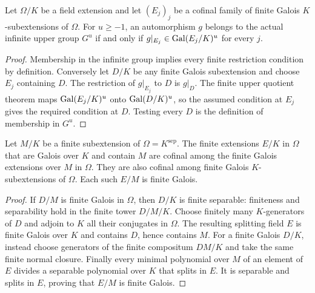 \begin{lemma}
\label{fw:cofinal-upper-conditions}
\leanok
Let $\Omega/K$ be a field extension and let $(E_j)_j$ be a cofinal
family of finite Galois $K$-subextensions of $\Omega$. For $u\geq-1$,
an automorphism $g$ belongs to the actual infinite upper group $G^u$
if and only if $g|_{E_j}\in\operatorname{Gal}(E_j/K)^u$ for every $j$.
\end{lemma}
\begin{proof}
Membership in the infinite group implies every finite restriction
condition by definition. Conversely let $D/K$ be any finite Galois
subextension and choose $E_j$ containing $D$. The restriction of
$g|_{E_j}$ to $D$ is $g|_D$. The finite upper quotient theorem maps
$\operatorname{Gal}(E_j/K)^u$ onto $\operatorname{Gal}(D/K)^u$, so the assumed condition at
$E_j$ gives the required condition at $D$. Testing every $D$ is the
definition of membership in $G^u$.
\end{proof}

\begin{lemma}
\label{fw:cofinal-base-galois-layers}
\leanok
Let $M/K$ be a finite subextension of $\Omega=K^{\mathrm{sep}}$.
The finite extensions $E/K$ in $\Omega$ that are Galois over $K$ and
contain $M$ are cofinal among the finite Galois extensions over $M$
in $\Omega$. They are also cofinal among finite Galois $K$-subextensions
of $\Omega$. Each such $E/M$ is finite Galois.
\end{lemma}
\begin{proof}
If $D/M$ is finite Galois in $\Omega$, then $D/K$ is finite separable:
finiteness and separability hold in the finite tower $D/M/K$.
Choose finitely many $K$-generators of $D$ and adjoin to $K$ all their
conjugates in $\Omega$. The resulting splitting field $E$ is finite
Galois over $K$ and contains $D$, hence contains $M$.
For a finite Galois $D/K$, instead choose generators of the finite
compositum $DM/K$ and take the same finite normal closure.
Finally every minimal polynomial over $M$ of an element of $E$ divides
a separable polynomial over $K$ that splits in $E$. It is separable
and splits in $E$, proving that $E/M$ is finite Galois.
\end{proof}

